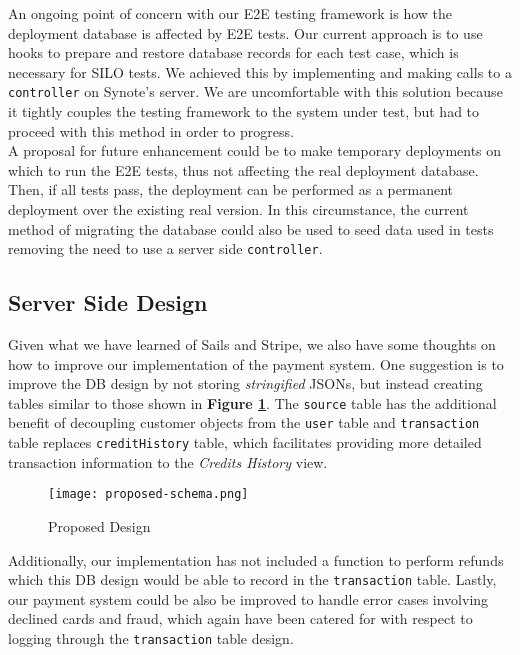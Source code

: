 An ongoing point of concern with our E2E testing framework is how the deployment database is affected by E2E tests. Our current approach is to use hooks to prepare and restore database records for each test case, which is necessary for SILO tests. We achieved this by implementing and making calls to a \texttt{controller} on Synote's server. We are uncomfortable with this solution because it tightly couples the testing framework to the system under test, but had to proceed with this method in order to progress.\\ 

A proposal for future enhancement could be to make temporary deployments on which to run the E2E tests, thus not affecting the real deployment database. Then, if all tests pass, the deployment can be performed as a permanent deployment over the existing real version. In this circumstance, the current method of migrating the database could also be used to seed data used in tests removing the need to use a server side \texttt{controller}.\\  

\subsection{Server Side Design}
\label{subsec:server-side-design}

Given what we have learned of Sails and Stripe, we also have some thoughts on how to improve our implementation of the payment system. One suggestion is to improve the DB design by not storing \textit{stringified} JSONs, but instead creating tables similar to those shown in \textbf{Figure \ref{fig:proposed-schema}}. The \texttt{source} table has the additional benefit of decoupling customer objects from the \texttt{user} table and \texttt{transaction} table replaces \texttt{creditHistory} table, which facilitates providing more detailed transaction information to the \textit{Credits History} view.\\

\begin{figure}[!hbt]
  	\centering
 	\texttt{[image: proposed-schema.png]}
  	\caption{Proposed Design}
 	\label{fig:proposed-schema}
\end{figure}

Additionally, our implementation has not included a function to perform refunds which this DB design would be able to record in the \texttt{transaction} table. Lastly, our payment system could be also be improved to handle error cases involving declined cards and fraud, which again have been catered for with respect to logging through the \texttt{transaction} table design.  

